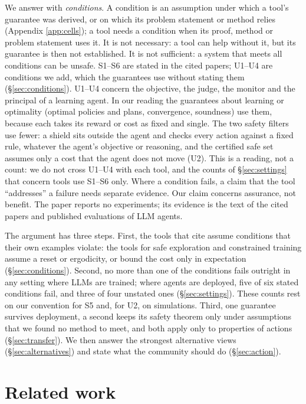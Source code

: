\documentclass{article}
\begin{document}
We answer with \emph{conditions}. A condition is an assumption under which a tool's guarantee was derived, or on which its problem statement or method relies (Appendix \ref{app:cells}); a tool needs a condition when its proof, method or problem statement uses it. It is not necessary: a tool can help without it, but its guarantee is then not established. It is not sufficient: a system that meets all conditions can be unsafe. S1--S6 are stated in the cited papers; U1--U4 are conditions we add, which the guarantees use without stating them (§\ref{sec:conditions}). U1--U4 concern the objective, the judge, the monitor and the principal of a learning agent. In our reading the guarantees about learning or optimality (optimal policies and plans, convergence, soundness) use them, because each takes its reward or cost as fixed and single. The two safety filters use fewer: a shield sits outside the agent and checks every action against a fixed rule, whatever the agent's objective or reasoning, and the certified safe set assumes only a cost that the agent does not move (U2). This is a reading, not a count: we do not cross U1--U4 with each tool, and the counts of §\ref{sec:settings} that concern tools use S1--S6 only. Where a condition fails, a claim that the tool ``addresses'' a failure needs separate evidence. Our claim concerns assurance, not benefit. The paper reports no experiments; its evidence is the text of the cited papers and published evaluations of LLM agents.

The argument has three steps. First, the tools that \citet{mclean2026} cite assume conditions that their own examples violate: the tools for safe exploration and constrained training assume a reset or ergodicity, or bound the cost only in expectation (§\ref{sec:conditions}). Second, no more than one of the conditions fails outright in any setting where LLMs are trained; where agents are deployed, five of six stated conditions fail, and three of four unstated ones (§\ref{sec:settings}). These counts rest on our convention for S5 and, for U2, on simulations. Third, one guarantee survives deployment, a second keeps its safety theorem only under assumptions that we found no method to meet, and both apply only to properties of actions (§\ref{sec:transfer}). We then answer the strongest alternative views (§\ref{sec:alternatives}) and state what the community should do (§\ref{sec:action}).

\hypertarget{sec:related}{%
\section{Related work}\label{sec:related}}
\end{document}
